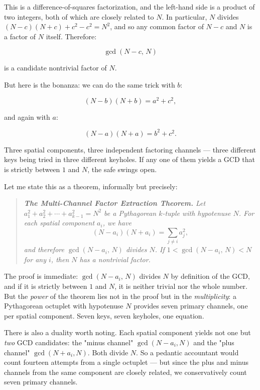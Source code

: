This is a difference-of-squares factorization, and the left-hand side is a product of two integers, both of which are closely related to $N$. In particular, $N$ divides $(N - c)(N + c) + c^2 - c^2 = N^2$, and so any common factor of $N - c$ and $N$ is a factor of $N$ itself. Therefore:

\[
\gcd(N - c, \, N)
\]

is a candidate nontrivial factor of $N$.

But here is the bonanza: we can do the same trick with $b$:

\[
(N - b)(N + b) = a^2 + c^2,
\]

and again with $a$:

\[
(N - a)(N + a) = b^2 + c^2.
\]

Three spatial components, three independent factoring channels --- three different keys being tried in three different keyholes. If any one of them yields a GCD that is strictly between $1$ and $N$, the safe swings open.

Let me state this as a theorem, informally but precisely:

\begin{quote}
\itshape \textbf{The Multi-Channel Factor Extraction Theorem.} Let $a_1^2 + a_2^2 + \cdots + a_{k-1}^2 = N^2$ be a Pythagorean $k$-tuple with hypotenuse $N$. For each spatial component $a_i$, we have  $$(N - a_i)(N + a_i) = \sum_{j \ne i} a_j^2,$$  and therefore $\gcd(N - a_i, \, N)$ divides $N$. If $1 < \gcd(N - a_i, \, N) < N$ for any $i$, then $N$ has a nontrivial factor.
\end{quote}

The proof is immediate: $\gcd(N - a_i, \, N)$ divides $N$ by definition of the GCD, and if it is strictly between $1$ and $N$, it is neither trivial nor the whole number. But the \textit{power} of the theorem lies not in the proof but in the \textit{multiplicity}: a Pythagorean octuplet with hypotenuse $N$ provides seven primary channels, one per spatial component. Seven keys, seven keyholes, one equation.

There is also a duality worth noting. Each spatial component yields not one but \textit{two} GCD candidates: the "minus channel" $\gcd(N - a_i, N)$ and the "plus channel" $\gcd(N + a_i, N)$. Both divide $N$. So a pedantic accountant would count fourteen attempts from a single octuplet --- but since the plus and minus channels from the same component are closely related, we conservatively count seven primary channels.

